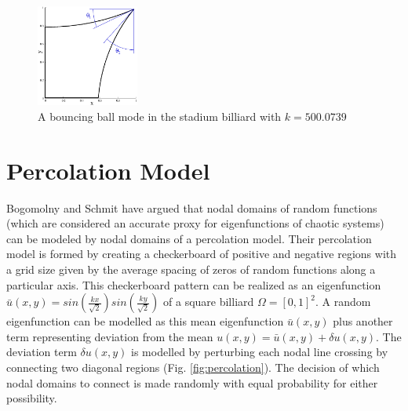 \documentclass{report}
\begin{document}
\begin{figure}
  \begin{center}
    \includegraphics[width=0.3\textwidth]{figs/domains/qugrs_fig.eps}
    \caption{A bouncing ball mode in the stadium billiard with $k = 500.0739$}
    \label{fig:bouncing_ball_mode}
  \end{center}
\end{figure}

\section{Percolation Model}
\label{sec:percolation}
Bogomolny and Schmit \cite{bogomolny} have argued that nodal domains of random functions (which are considered an accurate proxy for eigenfunctions of chaotic systems) can be modeled by nodal domains of a percolation model. Their percolation model is formed by creating a checkerboard of positive and negative regions with a grid size given by the average spacing of zeros of random functions along a particular axis. This checkerboard pattern can be realized as an eigenfunction $\bar{u}(x,y) = sin(\frac{kx}{\sqrt{2}})sin(\frac{ky}{\sqrt{2}})$ of a square billiard $\Omega = [0,1]^{2}$. A random eigenfunction can be modelled as this mean eigenfunction $\bar{u}(x,y)$ plus another term representing deviation from the mean $u(x,y) = \bar u(x,y) + \delta u(x,y)$. The deviation term $\delta u(x,y)$ is modelled by perturbing each nodal line crossing by connecting two diagonal regions (Fig. \ref{fig:percolation}). The decision of which nodal domains to connect is made randomly with equal probability for either possibility.
\end{document}
